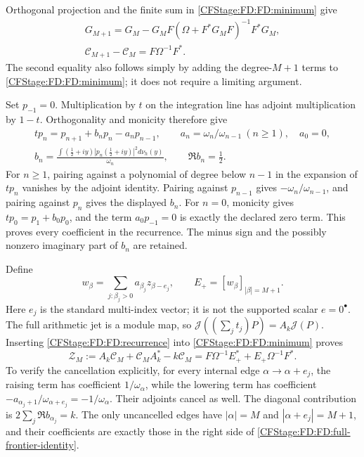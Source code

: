 Orthogonal projection and the finite sum in \eqref{CFStage:FD:FD:minimum} give
\begin{equation}
\begin{gathered}
G_{M+1}=G_M-G_MF(\Omega+F^*G_MF)^{-1}F^*G_M,\\
\mathcal C_{M+1}-\mathcal C_M=F\Omega^{-1}F^*.
\end{gathered}
\tag{FD.15}\label{CFStage:FD:FD:full-update}
\end{equation}
The second equality also follows simply by adding the degree-\(M+1\)
terms to \eqref{CFStage:FD:FD:minimum}; it does not require a limiting argument.

Set \(p_{-1}=0\).  Multiplication by \(t\) on the integration line has adjoint multiplication
by \(1-t\).  Orthogonality and monicity therefore give
\begin{equation}
\begin{gathered}
tp_n=p_{n+1}+b_np_n-a_np_{n-1},\qquad
a_n=\omega_n/\omega_{n-1}\ (n\ge1),\quad a_0=0,\\
b_n=\frac{\int(\tfrac12+iy)|p_n(\tfrac12+iy)|^2d\nu_h(y)}{\omega_n},
\qquad \Re b_n=\tfrac12.
\end{gathered}
\tag{FD.16}\label{CFStage:FD:FD:recurrence}
\end{equation}
For \(n\ge1\), pairing against a polynomial of degree below \(n-1\)
in the expansion of \(tp_n\)
vanishes by the adjoint identity.  Pairing against \(p_{n-1}\) gives
\(-\omega_n/\omega_{n-1}\), and pairing against \(p_n\) gives the
displayed \(b_n\).  For \(n=0\), monicity gives
\(tp_0=p_1+b_0p_0\), and the term \(a_0p_{-1}=0\) is exactly the
declared zero term.  This proves every coefficient in the recurrence.
The minus sign and the possibly nonzero imaginary part of \(b_n\) are
retained.

Define
\begin{equation}
w_\beta=\sum_{j:\beta_j>0}a_{\beta_j}z_{\beta-e_j},\qquad
E_+=[w_\beta]_{|\beta|=M+1}.
\tag{FD.17}\label{CFStage:FD:FD:lowering-jets}
\end{equation}
Here \(e_j\) is the standard multi-index vector; it is not the supported
scalar \(e=0^\bullet\).  The full arithmetic jet is a module map, so
\(\mathcal J((\sum_jt_j)P)=A_k\mathcal J(P)\).  Inserting
\eqref{CFStage:FD:FD:recurrence} into \eqref{CFStage:FD:FD:minimum} proves
\begin{equation}
\mathcal Z_M:=A_k\mathcal C_M+\mathcal C_MA_k^*-k\mathcal C_M
=F\Omega^{-1}E_+^*+E_+\Omega^{-1}F^*.
\tag{FD.18}\label{CFStage:FD:FD:full-frontier-identity}
\end{equation}
To verify the cancellation explicitly, for every internal edge
\(\alpha\to\alpha+e_j\), the raising term has coefficient
\(1/\omega_\alpha\), while the lowering term has coefficient
\(-a_{\alpha_j+1}/\omega_{\alpha+e_j}=-1/\omega_\alpha\).
Their adjoints cancel as well.  The diagonal contribution is
\(2\sum_j\Re b_{\alpha_j}=k\).  The only uncancelled edges have
\(|\alpha|=M\) and \(|\alpha+e_j|=M+1\), and their coefficients are
exactly those in the right side of \eqref{CFStage:FD:FD:full-frontier-identity}.

